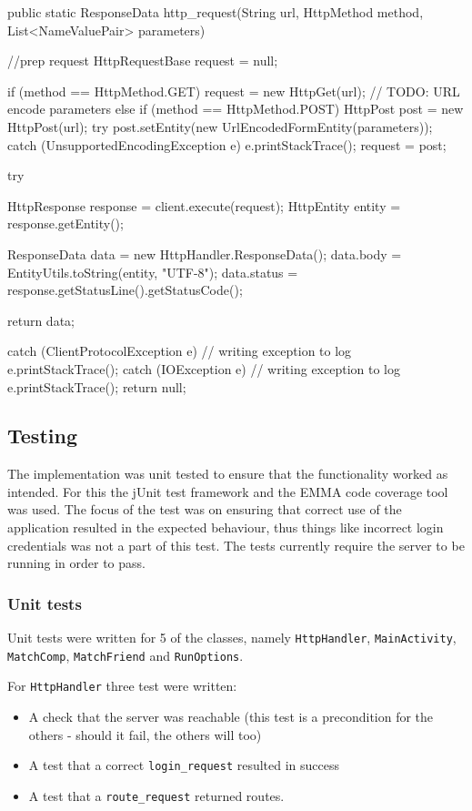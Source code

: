 \begin{code}[label={lst:http-request}, caption={The http-request function}, language=java]    
public static ResponseData http_request(String url, HttpMethod method, List<NameValuePair> parameters) {
	//prep request
	HttpRequestBase request = null;

	if (method == HttpMethod.GET) {
		request = new HttpGet(url);
		// TODO: URL encode parameters
	}
	else if (method == HttpMethod.POST) {
		HttpPost post = new HttpPost(url);
		try {
			post.setEntity(new UrlEncodedFormEntity(parameters));
		}
		catch (UnsupportedEncodingException e) {
			e.printStackTrace();
		}
		request = post;
	}

	try {
		HttpResponse response = client.execute(request);
		HttpEntity entity = response.getEntity();

		ResponseData data = new HttpHandler.ResponseData();
		data.body = EntityUtils.toString(entity, "UTF-8");
		data.status = response.getStatusLine().getStatusCode();

		return data;
	}
	catch (ClientProtocolException e) {
		// writing exception to log
		e.printStackTrace();
	}
	catch (IOException e) {
		// writing exception to log
		e.printStackTrace();
	}
	return null;
}
\end{code}

\subsection{Testing}
The implementation was unit tested to ensure that the functionality worked as intended. For this the jUnit \cite{junit} test framework and the EMMA \cite{emma} code coverage tool was used. The focus of the test was on ensuring that correct use of the application resulted in the expected behaviour, thus things like incorrect login credentials was not a part of this test. The tests currently require the server to be running in order to pass.

\subsubsection{Unit tests}
Unit tests were written for 5 of the classes, namely \texttt{HttpHandler}, \texttt{MainActivity}, \texttt{MatchComp}, \texttt{MatchFriend} and \texttt{RunOptions}. 
\vspace{10pt}

For \texttt{HttpHandler} three test were written:
\begin{itemize}
\item A check that the server was reachable (this test is a precondition for the others - should it fail, the others will too)
\item A test that a correct \texttt{login\_request} resulted in success 
\item A test that a \texttt{route\_request} returned routes.
\end{itemize}
\vspace{10pt}

